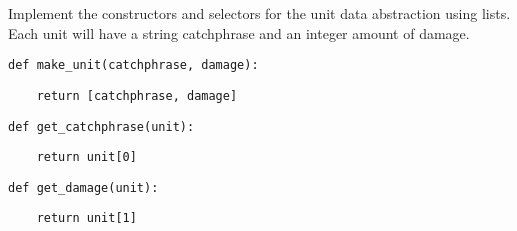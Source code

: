 \question Implement the constructors and selectors for the unit data abstraction
using lists.  Each unit will have a string catchphrase and an integer amount of
damage.

\begin{lstlisting}
def make_unit(catchphrase, damage):
\end{lstlisting}
\begin{solution}[0.6in]
\begin{lstlisting}
    return [catchphrase, damage]
\end{lstlisting}
\end{solution}

\begin{lstlisting}
def get_catchphrase(unit):
\end{lstlisting}
\begin{solution}[0.6in]
\begin{lstlisting}
    return unit[0]
\end{lstlisting}
\end{solution}

\begin{lstlisting}
def get_damage(unit):
\end{lstlisting}
\begin{solution}[0.6in]
\begin{lstlisting}
    return unit[1]
\end{lstlisting}
\end{solution}
